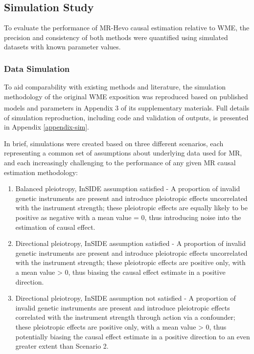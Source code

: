 \documentclass[
]{article}
\begin{document}
\subsection{Simulation Study}\label{simulation-study}

To evaluate the performance of MR-Hevo causal estimation relative to WME, the precision and consistency of both methods were quantified using simulated datasets with known parameter values.

\subsubsection{Data Simulation}\label{data-simulation}

To aid comparability with existing methods and literature, the simulation methodology of the original WME exposition was reproduced based on published models and parameters in Appendix 3 of its supplementary materials\textsuperscript{}. Full details of simulation reproduction, including code and validation of outputs, is presented in Appendix \ref{appendix-sim}.

In brief, simulations were created based on three different scenarios, each representing a common set of assumptions about underlying data used for MR, and each increasingly challenging to the performance of any given MR causal estimation methodology:

\begin{enumerate}
\def\labelenumi{\arabic{enumi}.}
\item
  Balanced pleiotropy, InSIDE assumption satisfied - A proportion of invalid genetic instruments are present and introduce pleiotropic effects uncorrelated with the instrument strength; these pleiotropic effects are equally likely to be positive as negative with a mean value = 0, thus introducing noise into the estimation of causal effect.
\item
  Directional pleiotropy, InSIDE assumption satisfied - A proportion of invalid genetic instruments are present and introduce pleiotropic effects uncorrelated with the instrument strength; these pleiotropic effects are positive only, with a mean value \textgreater{} 0, thus biasing the causal effect estimate in a positive direction.
\item
  Directional pleiotropy, InSIDE assumption not satisfied - A proportion of invalid genetic instruments are present and introduce pleiotropic effects correlated with the instrument strength through action via a confounder; these pleiotropic effects are positive only, with a mean value \textgreater{} 0, thus potentially biasing the causal effect estimate in a positive direction to an even greater extent than Scenario 2.
\end{enumerate}
\end{document}
